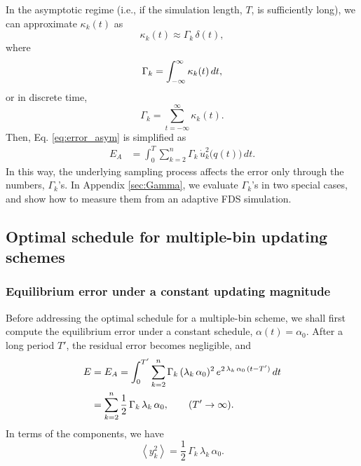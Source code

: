\documentclass[reprint, floatfix]{revtex4-1}
\newcommand{\Err}{E}
\begin{document}
In the asymptotic regime
(i.e., if the simulation length, $T$, is sufficiently long),
we can approximate $\kappa_k(t)$ as
%
\begin{equation}
  \kappa_k(t) \approx \Gamma_k \, \delta(t)
  ,
\label{eq:kappa_delta}
\end{equation}
%
where
\begin{equation}
  \Gamma_k = \int_{-\infty}^\infty \kappa_k(t) \, dt,
  \notag
\end{equation}
or in discrete time,
\begin{equation}
  \Gamma_k = \sum_{t = -\infty}^\infty \kappa_k(t).
  \label{eq:Gamma_sum}
\end{equation}
%
Then, Eq. \eqref{eq:error_asym} is simplified as
%
\begin{align}
  \Err_A
  &=
  \int_0^T
  \sum_{k = 2}^n
  \Gamma_k \, \dot u_k^2\bigl( q(t) \bigr) \, dt.
\label{eq:error_asym1}
\end{align}
%
In this way,
the underlying sampling process
affects the error only through the numbers,
$\Gamma_k$'s.
%
In Appendix \ref{sec:Gamma},
we evaluate $\Gamma_k$'s in two special cases,
and show how to measure them
from an adaptive FDS simulation.



\subsection{\label{sec:mbin_opta}
Optimal schedule for multiple-bin updating schemes}



\subsubsection{\label{sec:eqlerr}
Equilibrium error under a constant updating magnitude
}


Before addressing the optimal schedule
for a multiple-bin scheme,
we shall first compute the equilibrium error
under a constant schedule,
$\alpha(t) = \alpha_0$.
%
After a long period $T'$,
the residual error becomes negligible, and
%
\begin{align}
  \Err
  &=
  \Err_A
  =
  \int_0^{T'}
    \sum_{k = 2}^n
      \Gamma_k \, (\lambda_k \, \alpha_0)^2 \,
      e^{ 2 \, \lambda_k \, \alpha_0 \, (t - T') }
    \, dt
  \notag
  \\
  &
  =
  \sum_{ k = 2 }^n
    \frac 1 2 \, \Gamma_k \, \lambda_k \, \alpha_0
  ,
  \qquad
  ( T' \to \infty )
  .
\notag
\end{align}
%
In terms of the components, we have
%
\begin{equation}
  \left\langle
    y_k^2
  \right\rangle
  =
  \frac 1 2 \, \Gamma_k \, \lambda_k \, \alpha_0.
  \label{eq:y2_eql}
\end{equation}
%
\end{document}
